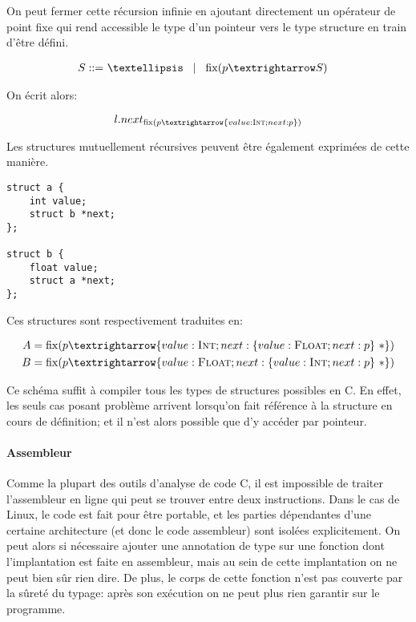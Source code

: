 On peut fermer cette récursion infinie en ajoutant directement un opérateur de
point fixe qui rend accessible le type d'un pointeur vers le type structure en
train d'être défini.

\begin{align*}
    S \gramisa & … \gramorx \mathrm{fix}(p → S)
\end{align*}

On écrit alors:

\[
  l.next_{ \mathrm{fix}(p → \{ value : \tInt ; next : p \}) }
\]

Les structures mutuellement récursives peuvent être également exprimées de cette
manière.

\begin{verbatim}
struct a {
    int value;
    struct b *next;
};

struct b {
    float value;
    struct a *next;
};
\end{verbatim}

Ces structures sont respectivement traduites en:

\begin{align*}
  A &= \mathrm{fix} (p → \{ value : \tInt   ; next : \{ value : \tFloat ; next : p \}~* \}) \\
  B &= \mathrm{fix} (p → \{ value : \tFloat ; next : \{ value : \tInt   ; next : p \}~* \})
\end{align*}

Ce schéma suffit à compiler tous les types de structures possibles en C. En
effet, les seuls cas posant problème arrivent lorsqu'on fait référence à la
structure en cours de définition; et il n'est alors possible que d'y accéder par
pointeur.

\paragraph{Assembleur}

Comme la plupart des outils d'analyse de code C, il est impossible de traiter
l'assembleur en ligne qui peut se trouver entre deux instructions. Dans le cas
de Linux, le code est fait pour être portable, et les parties dépendantes d'une
certaine architecture (et donc le code assembleur) sont isolées explicitement.
On peut alors si nécessaire ajouter une annotation de type sur une fonction dont
l'implantation est faite en assembleur, mais au sein de cette implantation on ne
peut bien sûr rien dire. De plus, le corps de cette fonction n'est pas
couverte par la sûreté du typage: après son exécution on ne peut plus rien
garantir sur le programme.

